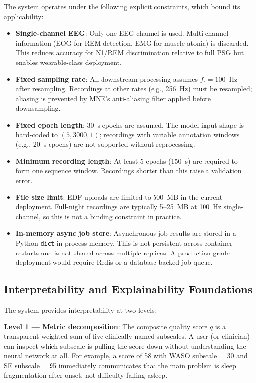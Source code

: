 \documentclass[10pt]{article}
\begin{document}
The system operates under the following explicit constraints, which bound its applicability:

\begin{itemize}
  \item \textbf{Single-channel EEG}: Only one EEG channel is used. Multi-channel information (EOG for REM detection, EMG for muscle atonia) is discarded. This reduces accuracy for N1/REM discrimination relative to full PSG but enables wearable-class deployment.
  \item \textbf{Fixed sampling rate}: All downstream processing assumes $f_s = 100$~Hz after resampling. Recordings at other rates (e.g., 256~Hz) must be resampled; aliasing is prevented by MNE's anti-aliasing filter applied before downsampling.
  \item \textbf{Fixed epoch length}: 30~s epochs are assumed. The model input shape is hard-coded to $(5, 3000, 1)$; recordings with variable annotation windows (e.g., 20~s epochs) are not supported without reprocessing.
  \item \textbf{Minimum recording length}: At least 5 epochs (150~s) are required to form one sequence window. Recordings shorter than this raise a validation error.
  \item \textbf{File size limit}: EDF uploads are limited to 500~MB in the current deployment. Full-night recordings are typically 5--25~MB at 100~Hz single-channel, so this is not a binding constraint in practice.
  \item \textbf{In-memory async job store}: Asynchronous job results are stored in a Python \texttt{dict} in process memory. This is not persistent across container restarts and is not shared across multiple replicas. A production-grade deployment would require Redis or a database-backed job queue.
\end{itemize}

\subsection{Interpretability and Explainability Foundations}
\label{sec:interpretability}

The system provides interpretability at two levels:

\textbf{Level 1 --- Metric decomposition}: The composite quality score $q$ is a transparent weighted sum of five clinically named subscales. A user (or clinician) can inspect which subscale is pulling the score down without understanding the neural network at all. For example, a score of 58 with WASO subscale = 30 and SE subscale = 95 immediately communicates that the main problem is sleep fragmentation after onset, not difficulty falling asleep.
\end{document}
